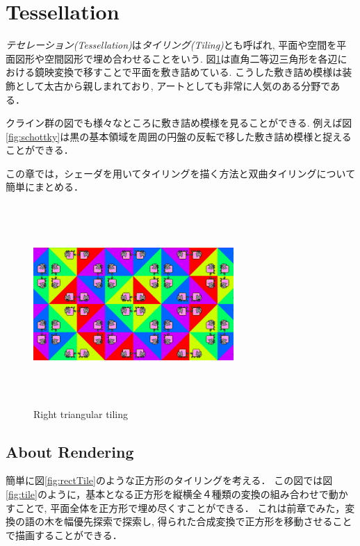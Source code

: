 
\section{Tessellation}

\emph{テセレーション}{\it (Tessellation)}は\emph{タイリング}{\it(Tiling)}とも呼ばれ, 平面や空間を平面図形や空間図形で埋め合わせることをいう. 
図\ref{fig:rightTriangular}は直角二等辺三角形を各辺における鏡映変換で移すことで平面を敷き詰めている. 
こうした敷き詰め模様は装飾として太古から親しまれており, アートとしても非常に人気のある分野である．

クライン群の図でも様々なところに敷き詰め模様を見ることができる. 
例えば図\ref{fig:schottky}は黒の基本領域を周囲の円盤の反転で移した敷き詰め模様と捉えることができる．

この章では，シェーダを用いてタイリングを描く方法と双曲タイリングについて簡単にまとめる．

\begin{figure}[h!tbp]
   \begin{center}
    \includegraphics[width=3in, height=3in, keepaspectratio]{../img/tessellation/rightTriangular.pdf}
    \caption{Right triangular tiling}
    \label{fig:rightTriangular}
   \end{center}
\end{figure}

\subsection{About Rendering}

簡単に図\ref{fig:rectTile}のような正方形のタイリングを考える．
この図では図\ref{fig:tile}のように，基本となる正方形を縦横全４種類の変換の組み合わせで動かすことで, 平面全体を正方形で埋め尽くすことができる．
これは前章でみた，変換の語の木を幅優先探索で探索し, 得られた合成変換で正方形を移動させることで描画することができる．

